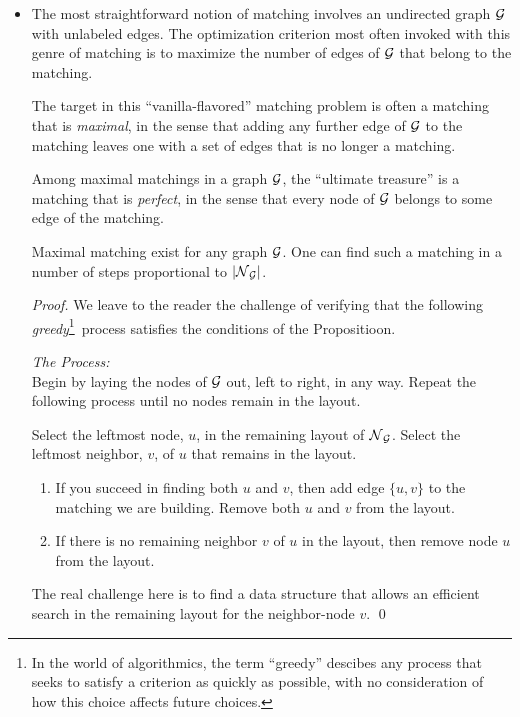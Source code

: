 \begin{itemize}
\item
The most straightforward notion of matching involves an undirected
graph $\mbox{$\cal G$}$ with unlabeled edges.  The optimization criterion most
often invoked with this genre of matching is to maximize the number of
edges of $\mbox{$\cal G$}$ that belong to the matching.

The target in this ``vanilla-flavored'' matching problem is often a
matching that is {\em maximal}, 
 in the sense that
adding any further edge of $\mbox{$\cal G$}$ to the matching leaves one with a set
of edges that is no longer a matching.

Among maximal matchings in a graph $\mbox{$\cal G$}$, the ``ultimate treasure'' is
a matching that is {\it perfect},  in
the sense that every node of $\mbox{$\cal G$}$ belongs to some edge of the
matching.

\begin{prop}
\label{thm:max-matching}
Maximal matching exist for any graph $\mbox{$\cal G$}$.  One can find such a
matching in a number of steps proportional to $|\mbox{$\cal N$}_{\mbox{{\scriptsize $\cal G$}}}|$.
\end{prop}

\begin{proof}
We leave to the reader the challenge of verifying that the following
 {\em greedy}\footnote{In the world of
  algorithmics, the term ``greedy'' descibes any process that seeks to
  satisfy a criterion as quickly as possible, with no consideration of
  how this choice affects future choices.}~process satisfies the
conditions of the Propositioon.

\noindent
{\it The Process:} \\
Begin by laying the nodes of $\mbox{$\cal G$}$ out, left to right, in any way.
Repeat the following process until no nodes remain in the layout.

\noindent
Select the leftmost node, $u$, in the remaining layout of $\mbox{$\cal N$}_{\mbox{{\scriptsize $\cal G$}}}$.
Select the leftmost neighbor, $v$, of $u$ that remains in the layout.
  \begin{enumerate}
  \item
If you succeed in finding both $u$ and $v$, then add edge $\{u,v\}$ to
the matching we are building.  Remove both $u$ and $v$ from the
layout.
  \item
If there is no remaining neighbor $v$ of $u$ in the layout, then
remove node $u$ from the layout.
  \end{enumerate}
The real challenge here is to find a data structure that allows an
efficient search in the remaining layout for the neighbor-node $v$.
\qed
\end{proof}


\end{itemize}
